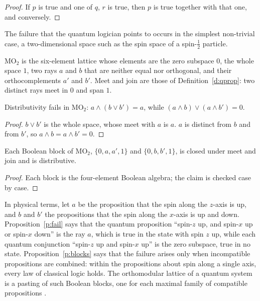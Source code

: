 \documentclass{situationist-preprint}
\begin{document}
\begin{proof}
If $p$ is true and one of $q$, $r$ is true, then $p$ is true together with that one, and conversely.
\end{proof}

The failure that the quantum logician points to occurs in the simplest non-trivial case, a two-dimensional space such as the spin space of a spin-$\frac{1}{2}$ particle.

\begin{definition}\label{d:mo2}
$\mathrm{MO}_2$ is the six-element lattice whose elements are the zero subspace $0$, the whole space $1$, two rays $a$ and $b$ that are neither equal nor orthogonal, and their orthocomplements $a'$ and $b'$. Meet and join are those of Definition~\ref{d:qprop}: two distinct rays meet in $0$ and span $1$.
\end{definition}

\begin{proposition}\label{p:fail}
Distributivity fails in $\mathrm{MO}_2$: $a \wedge (b \vee b') = a$, while $(a \wedge b) \vee (a \wedge b') = 0$.
\end{proposition}

\begin{proof}
$b \vee b'$ is the whole space, whose meet with $a$ is $a$. $a$ is distinct from $b$ and from $b'$, so $a \wedge b = a \wedge b' = 0$.
\end{proof}

\begin{proposition}\label{p:blocks}
Each Boolean block of $\mathrm{MO}_2$, $\{0, a, a', 1\}$ and $\{0, b, b', 1\}$, is closed under meet and join and is distributive.
\end{proposition}

\begin{proof}
Each block is the four-element Boolean algebra; the claim is checked case by case.
\end{proof}

In physical terms, let $a$ be the proposition that the spin along the $z$-axis is up, and $b$ and $b'$ the propositions that the spin along the $x$-axis is up and down. Proposition~\ref{p:fail} says that the quantum proposition \enquote{spin-$z$ up, and spin-$x$ up or spin-$x$ down} is the ray $a$, which is true in the state with spin $z$ up, while each quantum conjunction \enquote{spin-$z$ up and spin-$x$ up} is the zero subspace, true in no state. Proposition~\ref{p:blocks} says that the failure arises only when incompatible propositions are combined: within the propositions about spin along a single axis, every law of classical logic holds. The orthomodular lattice of a quantum system is a pasting of such Boolean blocks, one for each maximal family of compatible propositions \citep{KochenSpecker1967}.
\end{document}
